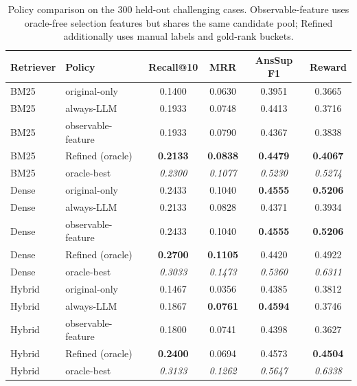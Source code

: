 \documentclass{article}
\begin{document}
\begin{table}[ht]
\centering
\caption{Policy comparison on the $300$ held-out challenging cases.
Observable-feature uses oracle-free selection features but shares the same
candidate pool; Refined additionally uses manual labels and gold-rank buckets.}
\label{tab:policy}
\begin{tabular}{llcccc}
\toprule
Retriever & Policy & Recall@10 & MRR & AnsSup F1 & Reward \\
\midrule
BM25 & original-only & 0.1400 & 0.0630 & 0.3951 & 0.3665 \\
BM25 & always-LLM    & 0.1933 & 0.0748 & 0.4413 & 0.3716 \\
BM25 & observable-feature & 0.1933 & 0.0790 & 0.4367 & 0.3838 \\
BM25 & Refined (oracle) & \textbf{0.2133} & \textbf{0.0838} & \textbf{0.4479} & \textbf{0.4067} \\
BM25 & oracle-best   & \textit{0.2300} & \textit{0.1077} & \textit{0.5230} & \textit{0.5274} \\
\midrule
Dense & original-only & 0.2433 & 0.1040 & \textbf{0.4555} & \textbf{0.5206} \\
Dense & always-LLM    & 0.2133 & 0.0828 & 0.4371 & 0.3934 \\
Dense & observable-feature & 0.2433 & 0.1040 & \textbf{0.4555} & \textbf{0.5206} \\
Dense & Refined (oracle) & \textbf{0.2700} & \textbf{0.1105} & 0.4420 & 0.4922 \\
Dense & oracle-best   & \textit{0.3033} & \textit{0.1473} & \textit{0.5360} & \textit{0.6311} \\
\midrule
Hybrid & original-only & 0.1467 & 0.0356 & 0.4385 & 0.3812 \\
Hybrid & always-LLM    & 0.1867 & \textbf{0.0761} & \textbf{0.4594} & 0.3746 \\
Hybrid & observable-feature & 0.1800 & 0.0741 & 0.4398 & 0.3627 \\
Hybrid & Refined (oracle) & \textbf{0.2400} & 0.0694 & 0.4573 & \textbf{0.4504} \\
Hybrid & oracle-best   & \textit{0.3133} & \textit{0.1262} & \textit{0.5647} & \textit{0.6338} \\
\bottomrule
\end{tabular}
\end{table}
\end{document}
